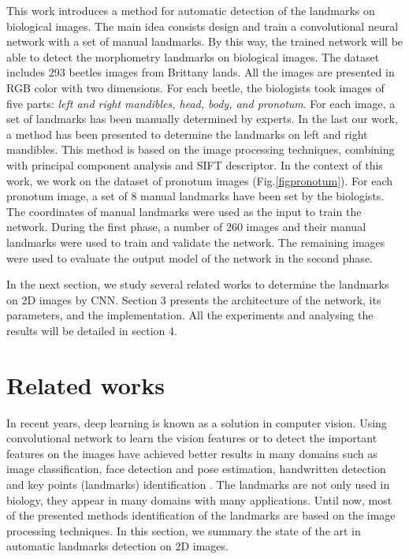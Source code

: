 \documentclass[conference]{IEEEtran}
\begin{document}
This work introduces a method for automatic detection of the landmarks on biological images. The main idea consists design and train a convolutional neural network\cite{lecun2010convolutional} with a set of manual landmarks. By this way, the trained network will be able to detect the morphometry landmarks on biological images. The dataset includes 293 beetles images from Brittany lands. All the images are presented in RGB color with two dimensions. For each beetle, the biologists took images of five parts: \textit{left and right mandibles, head, body, and pronotum}. For each image, a set of landmarks has been manually determined by experts. In the last our work, a method has been presented to determine the landmarks on left and right mandibles\cite{le2017maelab}. This method is based on the image processing techniques\cite{canny1986computational}, combining with principal component analysis\cite{shlens2014tutorial} and SIFT descriptor\cite{lowe2004distinctive}. In the context of this work, we work on the dataset of pronotum images (Fig.\ref{figpronotum}). For each pronotum image, a set of 8 manual landmarks have been set by the biologists. The coordinates of manual landmarks were used as the input to train the network. During the first phase, a number of 260 images and their manual landmarks were used to train and validate the network. The remaining images were used to evaluate the output model of the network in the second phase.

In the next section, we study several related works to determine the landmarks on 2D images by CNN. Section 3 presents the architecture of the network, its parameters, and the implementation. All the experiments and analysing the results will be detailed in section 4.
\section{Related works}
In recent years, deep learning is known as a solution in computer vision. Using convolutional network to learn the vision features or to detect the important features on the images have achieved better results in many domains such as image classification\cite{krizhevsky2012imagenet}\cite{ciregan2012multi}, face detection and pose estimation\cite{li2015convolutional,lawrence1997face,farfade2015multi,osadchy2007synergistic}, handwritten detection\cite{lecun1990handwritten}\cite{graves2009offline} and key points (landmarks) identification \cite{sun2013deep,zhang2014facial,cintas2016automatic}. The landmarks are not only used in biology, they appear in many domains with many applications. Until now, most of the presented methods identification of the landmarks are based on the image processing techniques\cite{palaniswamy2010automatic}\cite{kaur2015automatic}\cite{le2017maelab}. In this section, we summary the state of the art in automatic landmarks detection on 2D images.
\end{document}
